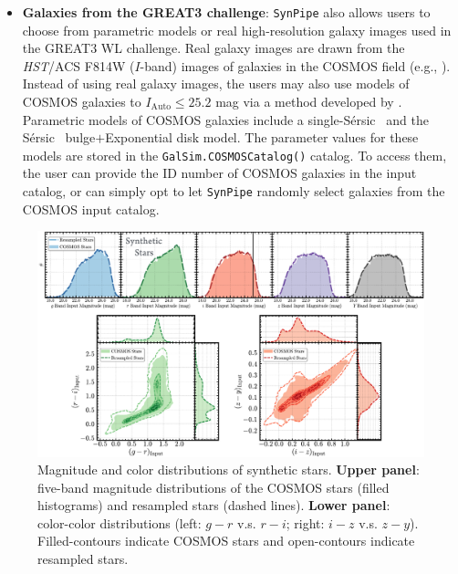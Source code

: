 \documentclass[useamsfonts]{pasj01}
\def\ser{{S\'{e}rsic\ }}
\def\synpipe{\texttt{SynPipe}}
\def\hst{{\textit{HST}}}
\begin{document}
\begin{itemize}
        \item \textbf{Galaxies from the GREAT3 challenge}: 
            \synpipe{} also allows users to choose from parametric models or real
            high-resolution galaxy images used in the GREAT3 WL challenge. 
            Real galaxy images are drawn from the \hst{}/ACS F814W ($I$-band) images 
            of galaxies in the COSMOS field (e.g., \citealt{Scoville2007,Leauthaud2007}). 
            Instead of using real galaxy images, the users may also use models of COSMOS 
            galaxies to $I_{\mathrm{Auto}}\leq25.2$ mag via a method developed by
            \citet{Lackner2012}.  
            Parametric models of COSMOS galaxies include a single-\ser{} and the \ser{}
            bulge$+$Exponential disk model. 
            The parameter values for these models are stored in the
            \texttt{GalSim.COSMOSCatalog()} catalog.
            To access them, the user can provide the ID number of COSMOS galaxies
            in the input catalog, or can simply opt to let \synpipe{} randomly select 
            galaxies from the COSMOS input catalog.
            
    \end{itemize}

\begin{figure}
    \begin{center}
        \includegraphics[width=\textwidth]{fig/synpipe_star_sample}
    \end{center}
    \caption{
        Magnitude and color distributions of synthetic stars.
        \textbf{Upper panel}: five-band magnitude distributions of the COSMOS
        stars (filled histograms) and  resampled stars (dashed lines).
        \textbf{Lower panel}: color-color distributions
        (left: $g-r$ v.s. $r-i$; right: $i-z$ v.s. $z-y$). 
        Filled-contours indicate COSMOS stars and open-contours indicate resampled stars.
        }
    \label{fig:star_sample}
\end{figure}
\end{document}
